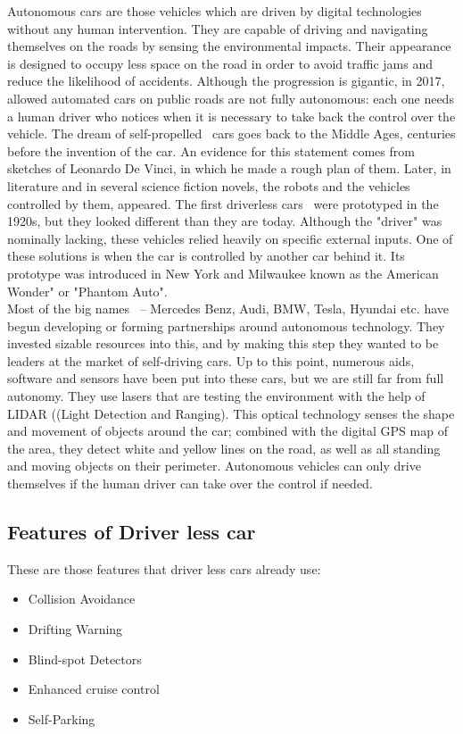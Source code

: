 Autonomous cars are those vehicles which are driven by digital technologies without any human intervention. They are  capable  of  driving  and navigating  themselves  on  the roads  by  sensing  the  environmental  impacts.  Their appearance is designed to occupy less space on the road in order  to  avoid  traffic  jams  and  reduce  the  likelihood  of accidents.  Although the  progression  is  gigantic, in  2017, allowed  automated  cars  on  public  roads  are  not  fully autonomous: each  one needs  a human driver who notices when  it  is  necessary  to  take  back  the  control  over  the vehicle. The dream of self-propelled~\cite{szikora2017self} cars goes back to the Middle Ages, centuries before the invention of the car. An evidence for  this  statement  comes  from  sketches  of  Leonardo  De Vinci, in which he  made a  rough plan  of them.  Later,  in literature and  in several science  fiction  novels,  the robots and the vehicles controlled by them, appeared. The first driverless cars~\cite{basu2019driverless}  were prototyped in the 1920s, but they  looked  different  than  they  are  today.  Although  the  "driver"  was  nominally  lacking,  these  vehicles  relied heavily on specific external inputs. One  of  these  solutions  is  when  the  car  is  controlled  by another car behind  it.  Its prototype  was introduced  in New  York  and  Milwaukee  known  as the  American Wonder" or "Phantom Auto".\\

Most of the big names~\cite{howley2012race}  – Mercedes Benz, Audi,  BMW, Tesla,  Hyundai etc. have begun  developing or  forming partnerships around  autonomous technology. They invested  sizable resources into this, and  by making this  step they wanted to be leaders at the market of self-driving cars. Up to  this point,  numerous aids,  software and  sensors have  been put  into these cars, but we are still  far from  full autonomy.  They use lasers that are testing the environment with the help of LIDAR ((Light Detection and Ranging). This optical technology senses the shape and movement of objects around the car; combined with the digital GPS map of the area, they detect white and yellow lines on the road, as well as all standing and moving objects on their perimeter.  
Autonomous vehicles can only drive themselves if the human driver can take over the control if needed. 

\subsection{Features of Driver less car}
These are those features that driver less cars already use: 
\begin{itemize}
	\item Collision Avoidance 
	\item Drifting Warning
	\item Blind-spot Detectors 
	\item Enhanced cruise control 
	\item Self-Parking 
\end{itemize}

